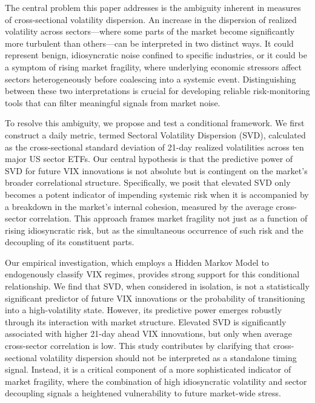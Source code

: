 \documentclass[]{article}
\begin{document}
The central problem this paper addresses is the ambiguity inherent in measures of cross-sectional volatility dispersion. An increase in the dispersion of realized volatility across sectors—where some parts of the market become significantly more turbulent than others—can be interpreted in two distinct ways. It could represent benign, idiosyncratic noise confined to specific industries, or it could be a symptom of rising market fragility, where underlying economic stressors affect sectors heterogeneously before coalescing into a systemic event. Distinguishing between these two interpretations is crucial for developing reliable risk-monitoring tools that can filter meaningful signals from market noise.

To resolve this ambiguity, we propose and test a conditional framework. We first construct a daily metric, termed Sectoral Volatility Dispersion (SVD), calculated as the cross-sectional standard deviation of 21-day realized volatilities across ten major US sector ETFs. Our central hypothesis is that the predictive power of SVD for future VIX innovations is not absolute but is contingent on the market's broader correlational structure. Specifically, we posit that elevated SVD only becomes a potent indicator of impending systemic risk when it is accompanied by a breakdown in the market's internal cohesion, measured by the average cross-sector correlation. This approach frames market fragility not just as a function of rising idiosyncratic risk, but as the simultaneous occurrence of such risk and the decoupling of its constituent parts.

Our empirical investigation, which employs a Hidden Markov Model to endogenously classify VIX regimes, provides strong support for this conditional relationship. We find that SVD, when considered in isolation, is not a statistically significant predictor of future VIX innovations or the probability of transitioning into a high-volatility state. However, its predictive power emerges robustly through its interaction with market structure. Elevated SVD is significantly associated with higher 21-day ahead VIX innovations, but only when average cross-sector correlation is low. This study contributes by clarifying that cross-sectional volatility dispersion should not be interpreted as a standalone timing signal. Instead, it is a critical component of a more sophisticated indicator of market fragility, where the combination of high idiosyncratic volatility and sector decoupling signals a heightened vulnerability to future market-wide stress.
\end{document}
